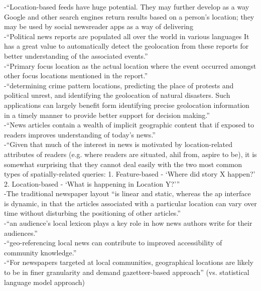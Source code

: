-{\color{orange}“Location-based feeds have huge potential. They may further develop as a way Google and other search engines return results based on a person’s location; they may be used by social newsreader apps as a way of delivering \cite{Marshall2012}}\\
-{\color{orange}“Political news reports are populated all over the world in various languages It has a great value to automatically detect the geolocation from these reports for better understanding of the associated events.”\cite{Imani2019}}\\
-{\color{orange}“Primary focus location as the actual location where the event occurred amongst other focus locations mentioned in the report.”\cite{Imani2019}}\\
-{\color{orange}“determining crime pattern locations, predicting the place of protests and political unrest, and identifying the geolocation of natural disasters. Such applications can largely benefit form identifying precise geolocation information in a timely manner to provide better support for decision making.”\cite{Imani2019}}\\
-{\color{orange}“News articles contain a wealth of implicit geographic content that if exposed to readers improves understanding of today’s news.”\cite{Teitler2008}}\\
-{\color{orange}“Given that much of the interest in news is motivated by location-related attributes of readers (e.g. where readers are situated, ahil from, aspire to be), it is somewhat surprising that they cannot deal easily with the two most common types of spatially-related queries: 1. Feature-based - ‘Where did story X happen?’ 2. Location-based - ‘What is happening in Location Y?’”\cite{Teitler2008}}\\
-{\color{orange}The traditional newspaper layout “is linear and static, whereas the ap interface is dynamic, in that the articles associated with a particular location can vary over time without disturbing the positioning of other articles.”\cite{Teitler2008}}\\
-{\color{orange}“an audience’s local lexicon plays a key role in how news authors write for their audiences.” \cite{Lieberman2010}}\\
-{\color{orange}“geo-referencing local news can contribute to improved accessibility of community knowledge.”\cite{Cai2016}}\\
-{\color{orange}“For newspapers targeted at local communities, geographical locations are likely to be in finer granularity and demand gazetteer-based approach” (vs. statistical language model approach)\cite{Cai2016}}\\
